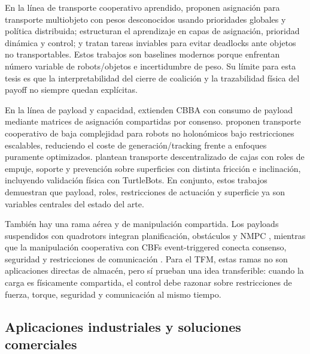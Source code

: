 En la línea de transporte cooperativo aprendido, \citet{shibata2022learning} proponen
asignación para transporte multiobjeto con pesos desconocidos usando prioridades globales
y política distribuida; \citet{naito2024tihdp} estructuran el aprendizaje en capas de
asignación, prioridad dinámica y control; y \citet{shida2024infeasible} tratan tareas
inviables para evitar deadlocks ante objetos no transportables. Estos trabajos son
baselines modernos porque enfrentan número variable de robots/objetos e incertidumbre de
peso. Su límite para esta tesis es que la interpretabilidad del cierre de coalición y la
trazabilidad física del payoff no siempre quedan explícitas.

En la línea de payload y capacidad, \citet{qiu2024cbpa} extienden CBBA con consumo de
payload mediante matrices de asignación compartidas por consenso. \citet{guan2025low}
proponen transporte cooperativo de baja complejidad para robots no holonómicos bajo
restricciones escalables, reduciendo el coste de generación/tracking frente a enfoques
puramente optimizados. \citet{bhatt2026box} plantean transporte descentralizado de cajas
con roles de empuje, soporte y prevención sobre superficies con distinta fricción e
inclinación, incluyendo validación física con TurtleBots. En conjunto, estos trabajos
demuestran que payload, roles, restricciones de actuación y superficie ya son variables
centrales del estado del arte.

También hay una rama aérea y de manipulación compartida. Los payloads suspendidos con
quadrotors integran planificación, obstáculos y NMPC \citep{kargar2025cable}, mientras
que la manipulación cooperativa con CBFs event-triggered conecta consenso, seguridad y
restricciones de comunicación \citep{zhuang2026safe}. Para el TFM, estas ramas no son
aplicaciones directas de almacén, pero sí prueban una idea transferible: cuando la carga
es físicamente compartida, el control debe razonar sobre restricciones de fuerza, torque,
seguridad y comunicación al mismo tiempo.

\subsection{Aplicaciones industriales y soluciones comerciales}

